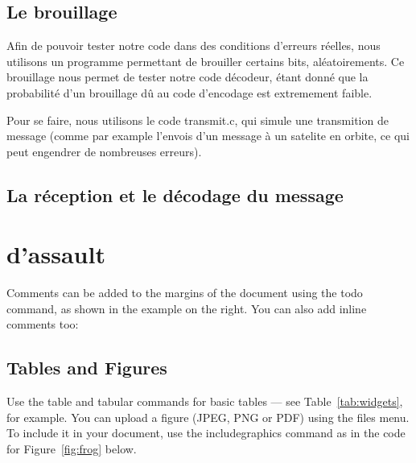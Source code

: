 
\subsection{Le brouillage}
\label{sub:brouillage}

Afin de pouvoir tester notre code dans des conditions d'erreurs réelles, nous utilisons un programme permettant de brouiller certains bits, aléatoirements. Ce brouillage nous permet de tester notre code décodeur, étant donné que la probabilité d'un brouillage dû au code d'encodage est extremement faible.

Pour se faire, nous utilisons le code transmit.c, qui simule une transmition de message (comme par example l'envois d'un message à un satelite en orbite, ce qui peut engendrer de nombreuses erreurs).



\subsection{La réception et le décodage du message}
\label{sub:La réception et le décodage du message}



\section{d'assault}
\label{sec:assault}


Comments can be added to the margins of the document using the  todo command, as shown in the example on the right. You can also add inline comments too:


\subsection{Tables and Figures}

Use the table and tabular commands for basic tables --- see Table~\ref{tab:widgets}, for example. You can upload a figure (JPEG, PNG or PDF) using the files menu. To include it in your document, use the includegraphics command as in the code for Figure~\ref{fig:frog} below.


